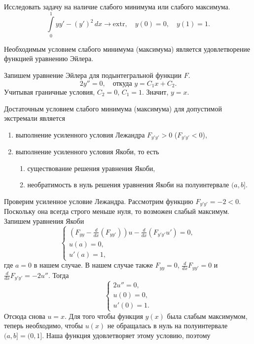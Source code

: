 \begin{problem}
  Исследовать задачу на наличие слабого минимума или слабого максимума. 
  \[
    \int\limits_{0}^{1} yy' - (y')^2\,dx \to \mathrm{extr}, \quad y(0) = 0,
    \quad y(1) = 1.
  \]
\begin{solution}
Необходимым условием слабого минимума (максимума) является удовлетворение
функцией
уравнению Эйлера.


  Запишем уравнение Эйлера для подынтегральной функции $ F $.  
  \[
    2y'' = 0, \quad \text{откуда } y = C_1 x + C_2.
  \]
 Учитывая граничные условия, $ C_2 = 0 $, $ C_1 = 1 $. Значит, $ y = x $. 

Достаточным условием слабого минимума (максимума) для допустимой экстремали является 
\begin{enumerate}
  \item выполнение усиленного условия Лежандра $ F_{y'y'} > 0 $ ($ F_{y'y'} < 0
    $),
  \item выполнение усиленного условия Якоби, то есть
    \begin{enumerate}
      \item существование решения уравнения Якоби,
      \item необратимость в нуль решения уравнения Якоби на полуинтервале $ (a,
        b]$.
    \end{enumerate}
\end{enumerate}


 Проверим усиленное условие Лежандра. Рассмотрим функцию $ F_{y'y'} = -2 < 0 $. Поскольку она всегда строго
 меньше нуля, то возможен слабый максимум. Запишем уравнения Якоби 
 \[
   \begin{cases}
     \left( F_{yy} - \frac{d}{dx} \left( F_{yy'} \right)  \right) u - \frac{d}{dx}
     \left( F_{y'y'} u' \right) = 0,\\
     u(a) = 0,\\
     u'(a) = 1,
   \end{cases}
 \]
 где $ a = 0 $ в нашем случае. В нашем случае также $ F_{yy} = 0 $, $
 \frac{d}{dx} F_{yy'} = 0 $ и $ \frac{d}{dx}F_{y'y'} = -2u'' $. Тогда  
 \[
     \begin{cases}
       2u'' =0, \\
       u(0) = 0,\\
       u'(0) = 1.
     \end{cases}
 \]
Отсюда снова $ u = x $. Для того чтобы функция $ y(x) $ была слабым максимумом,
теперь необходимо, чтобы $ u(x) $ не обращалась в нуль на полуинтервале $ (a, b] =
(0, 1] $. Наша функция удовлетворяет этому условию, поэтому  

\end{solution}
\end{problem}



